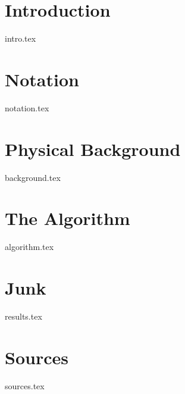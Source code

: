 \documentclass[a4paper,headsepline,11pt]{scrartcl}
\begin{document}
\clearpage

\section{Introduction}
{intro.tex}
\clearpage

\tableofcontents
\listoftodos
\clearpage

\section{Notation}
{notation.tex}
\clearpage

\section{Physical Background}
{background.tex}
\clearpage

\section{The Algorithm}
{algorithm.tex}
\clearpage

\section{Junk}
{results.tex}
\clearpage


\section{Sources}
{sources.tex}
\clearpage
\end{document}
